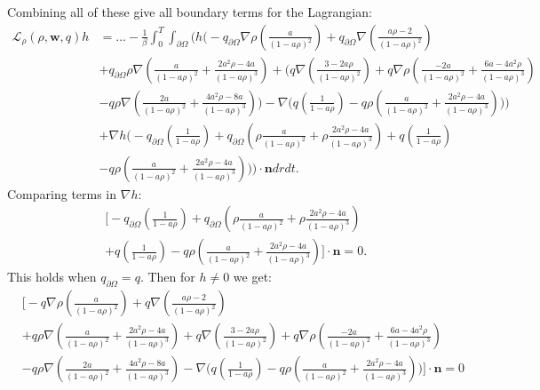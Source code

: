 \documentclass[11pt, a4paper]{article}
\theoremstyle{definition}
\newcommand{\w}{\mathbf{w}}
\newcommand{\n}{\mathbf{n}}
\begin{document}
Combining all of these give all boundary terms for the Lagrangian:
\begin{align*}
	\mathcal{L}_\rho (\rho,\w,q)h &=... - \frac{1}{\beta}\int_0^T \int_{\partial \Omega} \bigg( h \bigg(-  q_{\partial \Omega}\nabla \rho \left( \frac{a}{(1 -a \rho)^2} \right)+ q_{\partial \Omega} \nabla \left(\frac{a \rho  - 2}{(1- a \rho)^2}\right) \\
	&+  q_{\partial \Omega}\rho \nabla \left( \frac{a}{(1- a \rho)^2} + \frac{2a^2\rho - 4a}{(1- a \rho)^3} \right)
	+ \bigg( q  \nabla \left( \frac{3-2a\rho}{(1-a\rho)^2} \right) + q \nabla \rho  \left( \frac{-2a }{(1-a\rho)^2} + \frac{6a-4a^2  \rho}{(1-a\rho)^3}  \right)\\
	&- q\rho \nabla \left(\frac{2a }{(1-a\rho)^2} + \frac{4a^2\rho -8a}{(1-a\rho)^3} \right) \bigg) -  \nabla \bigg(q \left(\frac{1}{1- a\rho} \right)  - q\rho  \left(\frac{a }{(1-a\rho)^2} + \frac{2a^2\rho -4a}{(1-a\rho)^3} \right)  \bigg)	\bigg)\\
	& +\nabla h \bigg(- q_{\partial \Omega} \left(\frac{1}{1 - a\rho}\right) + q_{\partial \Omega}\left( \rho \frac{a}{(1- a \rho)^2} + \rho\frac{2a^2\rho - 4a}{(1- a \rho)^3} \right) +q \left(\frac{1}{1- a\rho} \right) \\
	& - q\rho  \left(\frac{a }{(1-a\rho)^2} + \frac{2a^2\rho -4a}{(1-a\rho)^3} \right)  \bigg) \bigg) \cdot \n dr dt.
\end{align*}
Comparing terms in $\nabla h$:
\begin{align*}
	&\bigg[-q_{\partial \Omega} \left(\frac{1}{1 - a\rho}\right) + q_{\partial \Omega}\left( \rho \frac{a}{(1- a \rho)^2} + \rho\frac{2a^2\rho - 4a}{(1- a \rho)^3} \right) \\
	&+q \left(\frac{1}{1- a\rho} \right)  - q\rho  \left(\frac{a }{(1-a\rho)^2} + \frac{2a^2\rho -4a}{(1-a\rho)^3} \right) \bigg] \cdot \n = 0.
\end{align*}
This holds when $q_{\partial \Omega} = q$.
Then for $h \neq 0$ we get:
\begin{align*}
	&\bigg[-q\nabla \rho \left( \frac{a}{(1 -a \rho)^2} \right)+q \nabla \left(\frac{a \rho  - 2}{(1- a \rho)^2}\right) \\
	&+q\rho \nabla \left( \frac{a}{(1- a \rho)^2} + \frac{2a^2\rho - 4a}{(1- a \rho)^3} \right)
	+  q  \nabla \left( \frac{3-2a\rho}{(1-a\rho)^2} \right) + q \nabla \rho  \left( \frac{-2a }{(1-a\rho)^2} + \frac{6a-4a^2  \rho}{(1-a\rho)^3}  \right)\\
	&- q\rho \nabla \left(\frac{2a }{(1-a\rho)^2} + \frac{4a^2\rho -8a}{(1-a\rho)^3} \right) -  \nabla \bigg(q \left(\frac{1}{1- a\rho} \right)  - q\rho  \left(\frac{a }{(1-a\rho)^2} + \frac{2a^2\rho -4a}{(1-a\rho)^3} \right) \bigg)\bigg] \cdot \n = 0
\end{align*}
\end{document}
